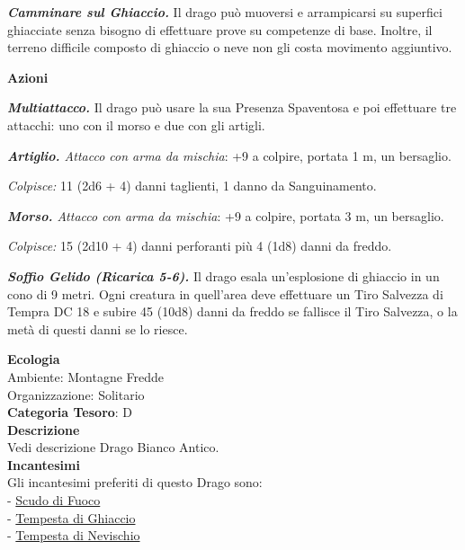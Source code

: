 \begin{multicols}{2}
{\emph{\textbf{Camminare sul Ghiaccio.}} Il drago può muoversi e arrampicarsi su superfici ghiacciate senza bisogno di effettuare prove su competenze di base. Inoltre, il terreno difficile composto di ghiaccio o neve non gli costa movimento aggiuntivo.

\textbf{Azioni}

\emph{\textbf{Multiattacco.}} Il drago può usare la sua Presenza Spaventosa e poi effettuare tre attacchi: uno con il morso e due con gli artigli.

\emph{\textbf{Artiglio.} Attacco con arma da mischia}: +9 a colpire, portata 1 m, un bersaglio.

\emph{Colpisce:} 11 (2d6 + 4) danni taglienti, 1 danno da Sanguinamento.

\emph{\textbf{Morso.} Attacco con arma da mischia}: +9 a colpire, portata 3 m, un bersaglio.

\emph{Colpisce:} 15 (2d10 + 4) danni perforanti più 4 (1d8) danni da freddo.

\emph{\textbf{Soffio Gelido (Ricarica 5-6).}} Il drago esala un'esplosione di ghiaccio in un cono di 9 metri. Ogni creatura in quell'area deve effettuare un Tiro Salvezza di Tempra DC 18 e subire 45 (10d8) danni da freddo se fallisce il Tiro Salvezza, o la metà di questi danni se lo riesce.

\textbf{Ecologia}\\
Ambiente: Montagne Fredde\\
Organizzazione: Solitario\\
\textbf{Categoria Tesoro}: D\\
\textbf{Descrizione}\\
Vedi descrizione Drago Bianco Antico.\\
\textbf{Incantesimi}\\
Gli incantesimi preferiti di questo Drago sono:\\
- \hyperlink{Scudo di Fuoco}{Scudo di Fuoco}\\
- \hyperlink{Tempesta di Ghiaccio}{Tempesta di Ghiaccio}\\
- \hyperlink{Tempesta di Nevischio}{Tempesta di Nevischio}

}
\end{multicols}
